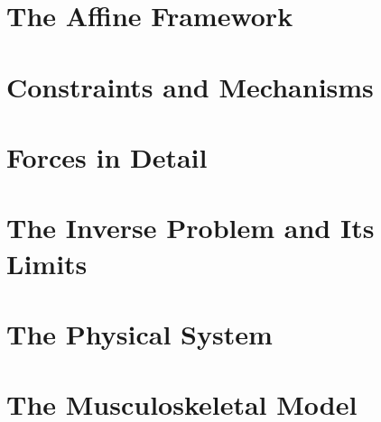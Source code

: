 \documentclass[10pt,letterpaper,openany]{book}
\theoremstyle{plain}
\begin{document}
\part{The Affine Framework}




\part{Constraints and Mechanisms}





\part{Forces in Detail}










\part{The Inverse Problem and Its Limits}


\part{The Physical System}




\part{The Musculoskeletal Model}




\end{document}
